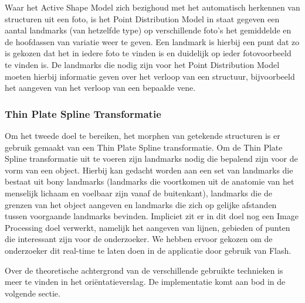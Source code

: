 Waar het Active Shape Model zich bezighoud met het automatisch herkennen van structuren uit een foto, is het Point Distribution Model\cite{pdm} in staat gegeven een aantal landmarks (van hetzelfde type) op verschillende foto's het gemiddelde en de hoofdassen van variatie weer te geven. Een landmark is hierbij een punt dat zo is gekozen dat het in iedere foto te vinden is en duidelijk op ieder fotovoorbeeld te vinden is. De landmarks die nodig zijn voor het Point Distribution Model moeten hierbij informatie geven over het verloop van een structuur, bijvoorbeeld het aangeven van het verloop van een bepaalde vene.

\subsubsection{Thin Plate Spline Transformatie}
Om het tweede doel te bereiken, het morphen van getekende structuren is er gebruik gemaakt van een Thin Plate Spline transformatie. Om de Thin Plate Spline transformatie uit te voeren zijn landmarks nodig die bepalend zijn voor de vorm van een object. Hierbij kan gedacht worden aan een set van landmarks die bestaat uit bony landmarks (landmarks die voortkomen uit de anatomie van het menselijk lichaam en voelbaar zijn vanaf de buitenkant), landmarks die de grenzen van het object aangeven en landmarks die zich op gelijke afstanden tussen voorgaande landmarks bevinden. 
Impliciet zit er in dit doel nog een Image Processing doel verwerkt, namelijk het aangeven van lijnen, gebieden of punten die interessant zijn voor de onderzoeker. We hebben ervoor gekozen om de onderzoeker dit real-time te laten doen in de applicatie door gebruik van Flash.

Over de theoretische achtergrond van de verschillende gebruikte technieken is meer te vinden in het ori\"{e}ntatieverslag. De implementatie komt aan bod in de volgende sectie. 




